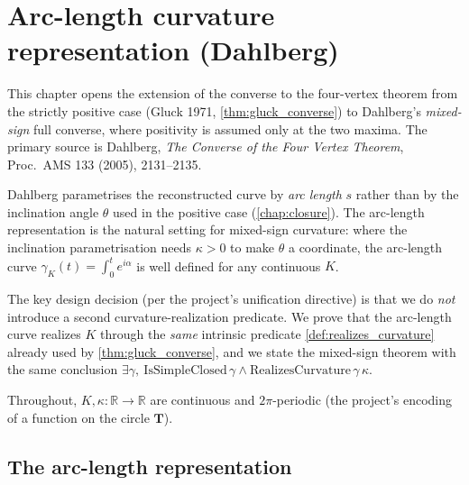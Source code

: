 \chapter{Arc-length curvature representation (Dahlberg)}
\label{chap:arclength}


This chapter opens the extension of the converse to the four-vertex theorem from
the strictly positive case (Gluck 1971, \cref{thm:gluck_converse}) to Dahlberg's
\emph{mixed-sign} full converse, where positivity is assumed only at the two
maxima. The primary source is Dahlberg, \emph{The Converse of the Four Vertex
Theorem}, Proc.\ AMS 133 (2005), 2131--2135.

Dahlberg parametrises the reconstructed curve by \emph{arc length} $s$ rather
than by the inclination angle $\theta$ used in the positive case
(\cref{chap:closure}). The arc-length representation is the natural setting for
mixed-sign curvature: where the inclination parametrisation needs $\kappa>0$ to
make $\theta$ a coordinate, the arc-length curve $\gamma_K(t)=\int_0^t
e^{i\alpha}$ is well defined for any continuous $K$.

The key design decision (per the project's unification directive) is that we do
\emph{not} introduce a second curvature-realization predicate. We prove that the
arc-length curve realizes $K$ through the \emph{same} intrinsic predicate
\cref{def:realizes_curvature} already used by \cref{thm:gluck_converse}, and we
state the mixed-sign theorem with the same conclusion $\exists\gamma,\
\mathrm{IsSimpleClosed}\,\gamma \wedge \mathrm{RealizesCurvature}\,\gamma\,\kappa$.

Throughout, $K,\kappa : \mathbb{R}\to\mathbb{R}$ are continuous and $2\pi$-periodic
(the project's encoding of a function on the circle $\mathbf{T}$).


\section{The arc-length representation}

